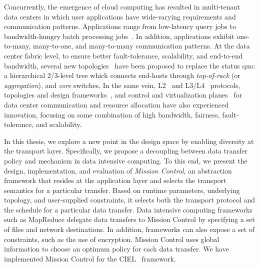 \documentclass[a4paper,12pt,twoside,openright]{report}
\begin{document}
Concurrently, the emergence of cloud computing has resulted in multi-tenant data
centers in which user applications have wide-varying requirements and
communication patterns. Applications range from low-latency query jobs to
bandwidth-hungry batch processing jobs~\cite{Alizadeh:2010:DCT}. In addition,
applications exhibit one-to-many, many-to-one, and many-to-many communication
patterns. At the data center fabric level, to ensure better fault-tolerance,
scalability, and end-to-end bandwidth, several new
topologies~\cite{Al-Fares:2008:SCD,Guo:2008:DSF,Guo:2009:BHP,Greenberg:2009:VSF}
have been proposed to replace the status quo: a hierarchical 2/3-level tree
which connects end-hosts through \emph{top-of-rack} (or \emph{aggregation}), and
\emph{core} switches. In the same vein,
L2~\cite{Mudigonda:2010:SCD,Vattikonda:2012:PTD} and
L3/L4~\cite{Alizadeh:2010:DCT,Vasudevan:2009:SEF,Raiciu:2010:DCN,Wilson:2011:BNL,Wu:2010:IIC}
protocols, topologies and design
frameworks~\cite{Singla:2011:JND,Al-Fares:2008:SCD,Guo:2008:DSF,Guo:2009:BHP,Greenberg:2009:VSF,Mudigonda:2011:TFC,Chen:2010:GAA},
and control and virtualization
planes~\cite{NiranjanMysore:2009:PSF,Mudigonda:2011:NSM,Guo:2010:SDC,Ballani:2011:TPD,Shieh:2011:SDC,Rodrigues:2011:GSB,Al-Fares:2010:HDF}
for data center communication and resource allocation have also experienced
innovation, focusing on some combination of high bandwidth, fairness,
fault-tolerance, and scalability.

In this thesis, we explore a new point in the design space by enabling diversity
at the transport layer. Specifically, we propose a decoupling between data
transfer policy and mechanism in data intensive computing. To this end, we
present the design, implementation, and evaluation of \emph{Mission Control}, an
abstraction framework that resides at the application layer and selects the
transport semantics for a particular transfer. Based on runtime parameters,
underlying topology, and user-supplied constraints, it selects both the
transport protocol and the schedule for a particular data transfer.
Data intensive computing frameworks such as MapReduce delegate data transfers to
Mission Control by specifying a set of files and network destinations. In
addition, frameworks can also expose a set of constraints, such as the use of
encryption. Mission Control uses global information to choose an optimum policy
for each data transfer. We have implemented Mission Control for the
CIEL~\cite{Murray:2011:CUE} framework.
\end{document}
